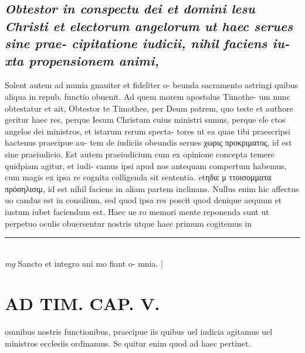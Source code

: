 \documentclass{article}
\begin{document}
\begin{pages}
\subsection*{\textit{Obtestor in conspectu dei et domini lesu Christi et electorum angelorum ut haec serues sine prae- cipitatione iudicii, nihil faciens iu- xta propensionem animi, }}\pstart Solent autem ad munia gnauiter et fideliter o- beunda sacramento astringi quibus aliqua in repub. functio obuenit. Ad quem morem apostolus Timothe- um nunc obtestatur et ait, Obtestor te Timothee, per Deum patrem, quo teste et authore geritur haec res, perque Iesum Christum cuius ministri sumus, perque ele ctos angelos dei ministros, et istarum rerum specta- tores ut ea quae tibi praescripsi hactenus praecipue au- tem de iudiciis obeundis serues χωρις προκριματος, id est sine praeiudicio. Est autem praeiudicium cum ex opinione concepta temere quidpiam agitur, et iudi- camus ipsi apud nos antequam compertum habemus, cum magis ex ipsa re cognita colligenda sit sententia. etηδιε μ ττοισομματα πρόσηλισιμ, id est nihil faciens in aliam partem inclinans. Nullus enim hic affectus uo candus est in consilium, sed quod ipsa res poscit quod denique aequum et iustum iubet faciendum est. Haec ue ro memori mente reponenda sunt ut perpetuo oculis obuersentur nostris utque haec primum cogitemus in  \pend
\vspace{0.5cm}\noindent
\vspace{0.2cm}\rule{1cm}{0.2pt}\\ 
\hspace{0.2cm}\textit{mg}
\footnotesize Sancto et integro ani mo fiant o- mnia. 
\normalsize| 
\section*{AD TIM. CAP. V. }
\marginpar{[ p.160 ]}\pstart omnibus nostris functionibus, praecipue iis quibus uel iudicia agitamus uel ministros ecclesiis ordinamus. Se quitur enim quod ad haec pertinet.  \pend
{}
{}

\end{pages}
\end{document}
